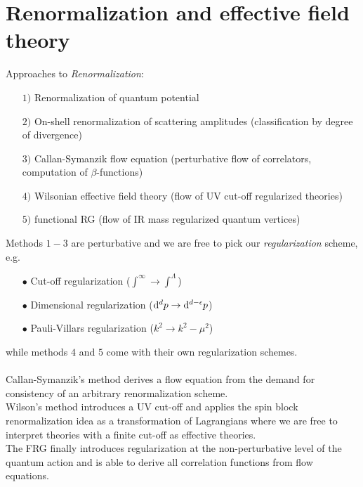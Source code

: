 \newpage

\section{Renormalization and effective field theory}
Approaches to \emph{Renormalization}:
\begin{enumerate}
	\item[$1)$] Renormalization of quantum potential
	\item[$2)$] On-shell renormalization of scattering amplitudes (classification by degree of divergence)
	\item[$3)$] Callan-Symanzik flow equation (perturbative flow of correlators, computation of $\beta$-functions)
	\item[$4)$] Wilsonian effective field theory (flow of UV cut-off regularized theories)
	\item[$5)$]functional RG (flow of IR mass regularized quantum vertices)
\end{enumerate}
Methods $1-3$ are perturbative and we are free to pick our \emph{regularization} scheme, e.g.
\begin{enumerate}
\item[$\bullet$] Cut-off regularization ($\int^\infty \rightarrow \int^\Lambda$)
\item[$\bullet$] Dimensional regularization ($\mathrm{d}^d p \rightarrow \mathrm{d}^{d-\epsilon} p$)
\item[$\bullet$] Pauli-Villars regularization ($k^2\rightarrow k^2-\mu^2$)
\end{enumerate}
while methods $4$ and $5$ come with their own regularization schemes.\\
\\
Callan-Symanzik's method derives a flow equation from the demand for consistency of an arbitrary renormalization scheme.\\
Wilson's method introduces a UV cut-off and applies the spin block renormalization idea as a transformation of Lagrangians where we are free to interpret theories with a finite cut-off as effective theories.\\
The FRG finally introduces regularization at the non-perturbative level of the quantum action and is able to derive all correlation functions from flow equations.\\
\\
